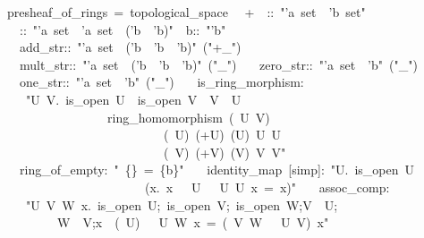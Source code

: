 \documentclass[12pt]{scrartcl}
\begin{document}

\begin{isabelle}
\ presheaf\_of\_rings\ =\ topological\_space\isanewline
\ \ +\ \ \isasymFF ::\ "'a\ set\ \isasymRightarrow \ 'b\ set"\isanewline
\ \ \ \isasymrho ::\ "'a\ set\ \isasymRightarrow \ 'a\ set\ \isasymRightarrow \ ('b\ \isasymRightarrow \ 'b)"\ \ b::\ "'b"\isanewline
\ \ \ add\_str::\ "'a\ set\ \isasymRightarrow \ ('b\ \isasymRightarrow \ 'b\ \isasymRightarrow \ 'b)"\ ("+\isactrlbsub \_\isactrlesub ")\isanewline
\ \ \ mult\_str::\ "'a\ set\ \isasymRightarrow \ ('b\ \isasymRightarrow \ 'b\ \isasymRightarrow \ 'b)"\ ("\isasymcdot \isactrlbsub \_\isactrlesub ")\isanewline
\ \ \ zero\_str::\ "'a\ set\ \isasymRightarrow \ 'b"\ ("\isasymzero \isactrlbsub \_\isactrlesub ")\ \isanewline
\ \ \ one\_str::\ "'a\ set\ \isasymRightarrow \ 'b"\ ("\isasymone \isactrlbsub \_\isactrlesub ")\isanewline
\ \ \ is\_ring\_morphism:\isanewline
\ \ \ \ "\isasymAnd U\ V.\ is\_open\ U\ \isasymLongrightarrow \ is\_open\ V\ \isasymLongrightarrow \ V\ \isasymsubseteq \ U\ \isanewline
\ \ \ \ \ \ \ \ \ \ \ \ \ \ \ \ \isasymLongrightarrow \ ring\_homomorphism\ (\isasymrho \ U\ V)\isanewline
\ \ \ \ \ \ \ \ \ \ \ \ \ \ \ \ \ \ \ \ \ \ \ \ \ \ (\isasymFF \ U)\ (+\isactrlbsub U\isactrlesub )\ (\isasymcdot \isactrlbsub U\isactrlesub )\ \isasymzero \isactrlbsub U\isactrlesub \ \isasymone \isactrlbsub U\isactrlesub \isanewline
\ \ \ \ \ \ \ \ \ \ \ \ \ \ \ \ \ \ \ \ \ \ \ \ \ \ (\isasymFF \ V)\ (+\isactrlbsub V\isactrlesub )\ (\isasymcdot \isactrlbsub V\isactrlesub )\ \isasymzero \isactrlbsub V\isactrlesub \ \isasymone \isactrlbsub V\isactrlesub "\isanewline
\ \ \ ring\_of\_empty:\ "\isasymFF \ \{\}\ =\ \{b\}"\isanewline
\ \ \ identity\_map\ [simp]:\ "\isasymAnd U.\ is\_open\ U\ \isanewline
\ \ \ \ \ \ \ \ \ \ \ \ \ \ \ \ \ \ \ \ \ \ \isasymLongrightarrow \ (\isasymAnd x.\ x\ \isasymin \ \isasymFF \ U\ \isasymLongrightarrow \ \isasymrho \ U\ U\ x\ =\ x)"\isanewline
\ \ \ assoc\_comp:\ \isanewline
\ \ \ \ "\isasymAnd U\ V\ W\ x.\ \isasymlbrakk is\_open\ U;\ is\_open\ V;\ is\_open\ W;V\ \isasymsubseteq \ U;\ \isanewline
\ \ \ \ \ \ \ \ \ W\ \isasymsubseteq \ V;x\ \isasymin \ (\isasymFF \ U)\isasymrbrakk \ \isasymLongrightarrow \ \isasymrho \ U\ W\ x\ =\ (\isasymrho \ V\ W\ \isasymcirc \ \isasymrho \ U\ V)\ x"
\end{isabelle}
\end{document}
